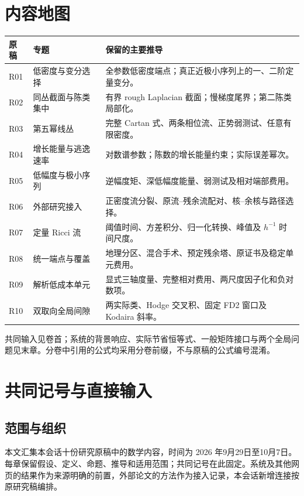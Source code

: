 \documentclass[UTF8,11pt,openany,oneside,fontset=none]{ctexbook}
\begin{document}
\chapter*{内容地图}
\begin{longtable}{p{}p{}p{}}
\toprule 原稿&专题&保留的主要推导\\\midrule
R01&低密度与变分选择&全参数低密度端点；真正近极小序列上的一、二阶定量变分。\\
R02&同丛截面与陈类集中&有界 rough Laplacian 截面；慢梯度尾界；第二陈类局部化。\\
R03&第五幂线丛&完整 Cartan 式、两条相位流、正势弱测试、任意有限密度。\\
R04&增长能量与逃逸速率&对数谱参数；陈数的增长能量约束；实际误差幂次。\\
R05&低幅度与极小序列&逆幅度矩、深低幅度能量、弱测试及相对端部费用。\\
R06&外部研究接入&正密度流分裂、原流--残余流配对、核--余核与路径选择。\\
R07&定量 Ricci 流&阈值时间、方差积分、归一化转换、峰值及 $h^{-1}$ 时间尺度。\\
R08&统一端点与覆盖&地理分区、混合手术、预定残余塔、原证书及稳定单元费用。\\
R09&解析低成本单元&显式三轴度量、完整相对费用、两尺度因子化和负对数项。\\
R10&双取向全局间隙&两实际类、Hodge 交叉积、固定 FD2 窗口及 Kodaira 斜率。\\
\bottomrule
\end{longtable}
共同输入见卷首；系统的背景响应、实际节省恒等式、一般矩阵接口与两个全局问题见末章。分卷中引用的公式均采用分卷前缀，不与原稿的公式编号混淆。
\tableofcontents
\mainmatter
\setcounter{chapter}{-1}

\chapter{共同记号与直接输入}\label{chapter:0}
\section{范围与组织}\label{ch0:ux8303ux56f4ux4e0eux7ec4ux7ec7}

本文汇集本会话十份研究原稿中的数学内容，时间为 2026 年9月29日至10月7日。每章保留假设、定义、命题、推导和适用范围；共同记号在此固定。系统及其他网页的结果作为来源明确的前置，外部论文的方法作为接入记录，本会话新增连接按原研究稿编排。
\end{document}
